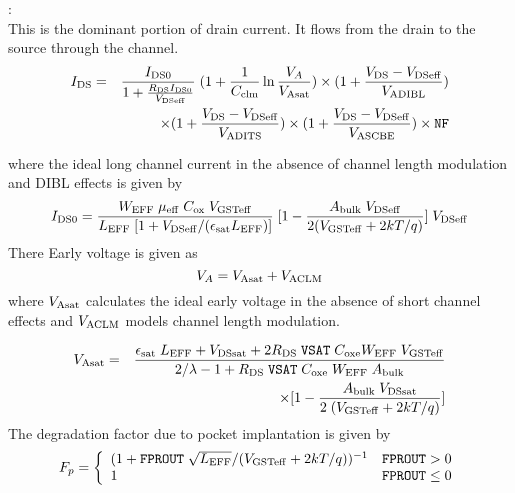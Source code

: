 \documentclass{article}
\begin{document}
:\\
This is the dominant portion of drain current. It flows from the
drain to the source through the channel.
\begin{eqnarray}
I_{\rm{DS}}& = & {I_{\rm{DS0}} \over  1 + {R_{\rm{DS}}
I_{\rm{DS0}} \over V_{\rm{DSeff}}}} \; (1 + {1 \over C_{\rm{clm}}}
\ln{V_A \over V_{\rm{Asat}}}) \times (1 +
{V_{\rm{DS}} - V_{\rm{DSeff}} \over V_{\rm{ADIBL}}}) \nonumber \\
       &  & \times (1 + {V_{\rm{DS}} - V_{\rm{DSeff}} \over V_{\rm{ADITS}}}) \times (1 + {V_{\rm{DS}}
         - V_{\rm{DSeff}} \over V_{\rm{ASCBE}}}) \times \texttt{NF}
\end{eqnarray}

where the ideal long channel current in the absence of channel
length modulation and DIBL effects is given by
\begin{equation}
I_{\rm{DS0}} = {W_{\rm{EFF}} \;\mu_{\rm{eff}} \;C_{\rm{ox}}
\;V_{\rm{GSTeff}} \over L_{\rm{EFF}}\;[1 + V_{\rm{DSeff}} /
(\epsilon_{\rm{sat}} L_{\rm{EFF}})]} \; [1 -
{A_{\rm{bulk}}\;V_{\rm{DSeff}} \over 2(V_{\rm{GSTeff}} + 2kT/q)}]
\; V_{\rm{DSeff}}
\end{equation}
\noindent There Early voltage is given as
\begin{equation}
V_A = V_{\rm{Asat}} + V_{\rm{ACLM}}
\end{equation}
where $V_{\rm{Asat}}$ calculates the ideal early voltage in the
absence of short channel effects and $V_{\rm{ACLM}}$ models
channel length modulation.

\begin{eqnarray}
V_{\rm{Asat}} & = & {\epsilon_{\rm{sat}}\;L_{\rm{EFF}} +
V_{\rm{DSsat}} + 2 R_{\rm{DS}}\;\texttt{VSAT} \;C_{\rm{oxe}}
W_{\rm{EFF}}\; V_{\rm{GSTeff}} \over 2/\lambda - 1
+ R_{\rm{DS}}\;\texttt{VSAT}\; C_{\rm{oxe}}\; W_{\rm{EFF}}\; A_{\rm{bulk}}} \nonumber \\
           & & \times [1 - {A_{\rm{bulk}}\;V_{\rm{DSsat}} \over 2\;(V_{\rm{GSTeff}} + 2kT/q)}]
\end{eqnarray}
\noindent The degradation factor due to pocket implantation is
given by
\begin{equation}
F_p = \left\{\begin{array}{ll}
       (1 + \texttt{FPROUT}\;\sqrt{L_{\rm{EFF}}} / (V_{\rm{GSTeff}} + 2kT/q))^{-1} &  \texttt{FPROUT} > 0 \nonumber \\
        1 & \texttt{FPROUT} \leq 0
                            \end{array}
                    \right.
\end{equation}
\end{document}
